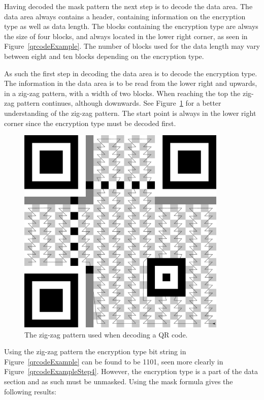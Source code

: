 Having decoded the mask pattern the next step is to decode the data area. The data area always contains a header, containing information on the encryption type as well as data length. The blocks containing the encryption type are always the size of four blocks, and always located in the lower right corner, as seen in Figure~\ref{qrcodeExample}. The number of blocks used for the data length may vary between eight and ten blocks depending on the encryption type.

As such the first step in decoding the data area is to decode the encryption type. The information in the data area is to be read from the lower right and upwards, in a zig-zag pattern, with a width of two blocks. When reaching the top the zig-zag pattern continues, although downwards. See Figure~\ref{qrcodezigzag} for a better understanding of the zig-zag pattern. The start point is always in the lower right corner since the encryption type must be decoded first.

	\begin{figure}[H]%
		\centering
		\includegraphics[width=100mm]{images/qrcodezigzag}
		\caption{The zig-zag pattern used when decoding a QR code.}
		\label{qrcodezigzag}
	\end{figure}

Using the zig-zag pattern the encryption type bit string in Figure~\ref{qrcodeExample} can be found to be 1101, seen more clearly in Figure~\ref{qrcodeExampleStep4}. However, the encryption type is a part of the data section and as such must be unmasked. Using the mask formula gives the following results:

